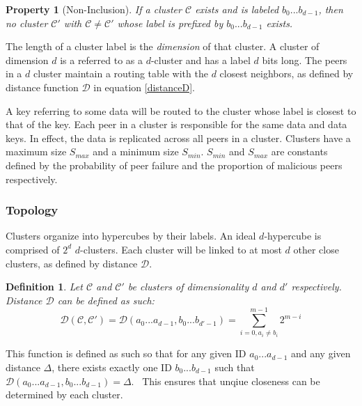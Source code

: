 \documentclass[apa6]{IEEEtran}
\theoremstyle{plain}
\newtheorem{property}{Property}
\newtheorem{definition}{Definition}
\begin{document}
			\begin{property}[Non-Inclusion]
				\label{non-inclusion}
				If a cluster $\mathcal{C}$ exists and is labeled $b_0...b_{d-1}$, 
				then no cluster $\mathcal{C'}$ with $\mathcal{C} \neq \mathcal{C'}$ whose label is prefixed by $b_0...b_{d-1}$ exists.
			\end{property}

			The length of a cluster label is the \textit{dimension} of that cluster. 
			A cluster of dimension $d$ is a referred to as a $d$-cluster and has a label $d$ bits long.
			The peers in a $d$ cluster maintain a routing table with the $d$ closest neighbors, 
			as defined by distance function $\mathcal{D}$ in equation \ref{distanceD}. 
			
			A key referring to some data will be routed to the cluster whose label is closest to that of the key.
			Each peer in a cluster is responsible for the same data and data keys.
			In effect, the data is replicated across all peers in a cluster.
			Clusters have a maximum size $S_{max}$ and a minimum size $S_{min}$.
			$S_{min}$ and $S_{max}$ are constants defined by the probability of peer failure and the proportion of malicious peers respectively.

		\subsubsection{Topology}
			Clusters organize into hypercubes by their labels. An ideal $d$-hypercube is comprised of $2^d$ $d$-clusters. 
			Each cluster will be linked to at most $d$ other close clusters, as defined by distance $\mathcal{D}$. 
			
			\begin{definition}
				Let $\mathcal{C}$ and $\mathcal{C'}$ be clusters of dimensionality $d$ and $d'$ respectively. Distance $\mathcal{D}$ can be defined as such:
				\begin{equation}
					\label{distanceD}
					\mathcal{D(C,C')} = \mathcal{D}(a_0...a_{d-1}, b_0...b_{d'-1})=\sum\limits_{i=0,a_i \neq b_i}^{m-1} 2^{m-i}
				\end{equation}
			\end{definition}

			This function is defined as such so that for any given ID $a_0...a_{d-1}$ and any given distance $\Delta$,
			there exists exactly one ID $b_0...b_{d-1}$ such that $\mathcal{D}(a_0...a_{d-1},b_0...b_{d-1}) = \Delta$. \
			This ensures that unqiue closeness can be determined by each cluster.
			
\end{document}
